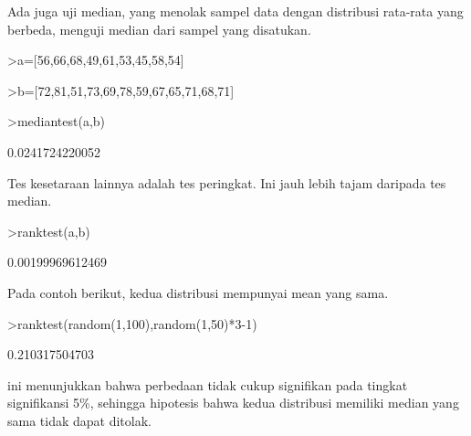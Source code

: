 \documentclass{article}
\begin{document}
\begin{eulernotebook}
\begin{eulercomment}
\begin{eulercomment}
\begin{eulercomment}
\begin{eulercomment}
\begin{eulercomment}
Ada juga uji median, yang menolak sampel data dengan distribusi
rata-rata yang berbeda, menguji median dari sampel yang disatukan.
\end{eulercomment}
\begin{eulerprompt}
>a=[56,66,68,49,61,53,45,58,54]
\end{eulerprompt}
\begin{euleroutput}
  [56,  66,  68,  49,  61,  53,  45,  58,  54]
\end{euleroutput}
\begin{eulerprompt}
>b=[72,81,51,73,69,78,59,67,65,71,68,71]
\end{eulerprompt}
\begin{euleroutput}
  [72,  81,  51,  73,  69,  78,  59,  67,  65,  71,  68,  71]
\end{euleroutput}
\begin{eulerprompt}
>mediantest(a,b)
\end{eulerprompt}
\begin{euleroutput}
  0.0241724220052
\end{euleroutput}
\begin{eulercomment}
Tes kesetaraan lainnya adalah tes peringkat. Ini jauh lebih tajam
daripada tes median.
\end{eulercomment}
\begin{eulerprompt}
>ranktest(a,b)
\end{eulerprompt}
\begin{euleroutput}
  0.00199969612469
\end{euleroutput}
\begin{eulercomment}
Pada contoh berikut, kedua distribusi mempunyai mean yang sama.
\end{eulercomment}
\begin{eulerprompt}
>ranktest(random(1,100),random(1,50)*3-1)
\end{eulerprompt}
\begin{euleroutput}
  0.210317504703
\end{euleroutput}
\begin{eulercomment}
ini menunjukkan bahwa perbedaan tidak cukup signifikan pada tingkat
signifikansi 5\%, sehingga hipotesis bahwa kedua distribusi memiliki
median yang sama tidak dapat ditolak.


\end{eulercomment}
\end{eulercomment}
\end{eulercomment}
\end{eulercomment}
\end{eulercomment}
\end{eulernotebook}
\end{document}
